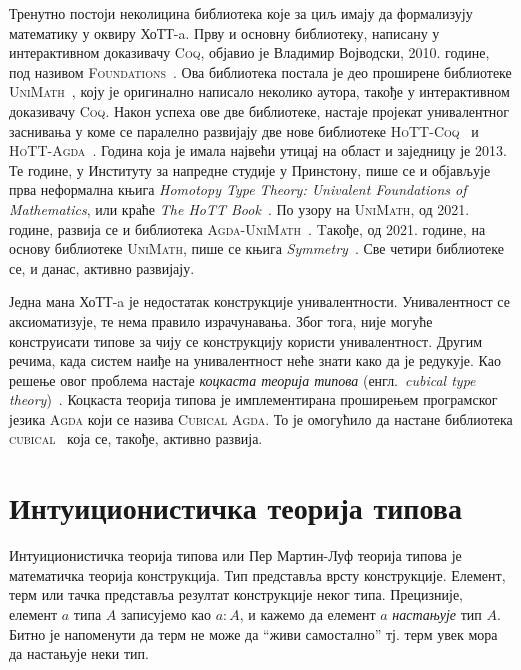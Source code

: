 \documentclass[12pt,oneside]{memoir}
\begin{document}
Тренутно постоји неколицина библиотека које за циљ имају да формализују математику у оквиру ХоТТ-a. Прву и основну библиотеку, написану у интерактивном доказивачу \textsc{Coq}, објавио је Владимир Војводски, 2010. године, под називом \textsc{Foundations}~\cite{vlad_found}. Ова библиотека постала је део проширене библиотеке \textsc{UniMath}~\cite{unimath}, коју је оригинално написало неколико аутора, такође у интерактивном доказивачу \textsc{Coq}. Након успеха ове две библиотеке, настаје пројекат унивалентног заснивања у коме се паралелно развијају две нове библиотеке \textsc{HoTT-Coq}~\cite{hottcoq} и \textsc{HoTT-Agda}~\cite{hottagda}. Година која је имала највећи утицај на област и заједницу је 2013. Те године, у Институту за напредне студије у Принстону, пише се и објављује прва неформална књига \emph{Homotopy Type Theory: Univalent Foundations of Mathematics}, или краће \emph{The HoTT Book}~\cite{hottbook}. По узору на \textsc{UniMath}, од 2021. године, развија се и библиотека \textsc{Agda-UniMath}~\cite{agda-unimath}. Tакође, од 2021. године, на основу библиотеке \textsc{UniMath}, пише се књига \emph{Symmetry}~\cite{symm}. Све четири библиотеке се, и данас, активно развијају.

Једна мана ХоТТ-a је недостатак конструкције унивалентности. Унивалентност се аксиоматизује, те нема правило израчунавања. Због тога, није могуће конструисати типове за чију се конструкцију користи унивалентност. Другим речима, када систем наиђе на унивалентност неће знати како да је редукује. Као решење овог проблема настаје \emph{коцкаста теорија типова} (енгл.~\emph{cubical type theory})~\cite{coh16, coq18}. Коцкаста теорија типова је имплементирана проширењем програмског језика \textsc{Agda} који се
назива \textsc{Cubical Agda}. То је омогућило да настане библиотека \textsc{cubical}~\cite{vez21} која се, такође, активно развија.

\chapter{Интуиционистичка теорија типова}
\label{cha:int}

Интуиционистичка теорија типова или Пер Мартин-Луф теорија типова је математичка теорија конструкција. Тип представља врсту конструкције. Елемент, терм или тачка представља резултат конструкције неког типа. Прецизније, елемент $a$ типа $A$ записујемо као $a : A$, и кажемо да елемент $a$ \emph{настањује} тип $A$. Битно је напоменути да терм не може да ``живи самостално'' тј. терм увек мора да настањује неки тип. 
\end{document}
